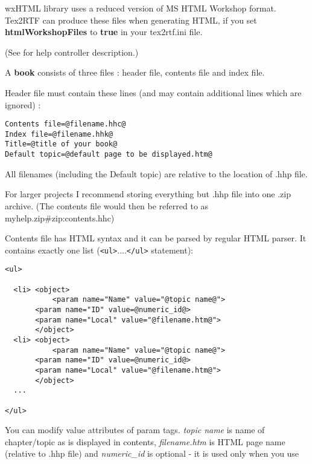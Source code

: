 \label{helpformat}

wxHTML library uses a reduced version of MS HTML Workshop format.
Tex2RTF can produce these files when generating HTML, if you set {\bf htmlWorkshopFiles} to {\bf true} in
your tex2rtf.ini file.

(See  for help controller description.)

A {\bf book} consists of three files : header file, contents file and index file.


Header file must contain these lines (and may contain additional lines which are ignored) :

\begin{verbatim}
Contents file=@filename.hhc@
Index file=@filename.hhk@
Title=@title of your book@
Default topic=@default page to be displayed.htm@
\end{verbatim}

All filenames (including the Default topic) are relative to the location of .hhp file.

For larger projects I recommend storing everything but .hhp file into one .zip archive. (The contents file 
would then be referred to as myhelp.zip\#zip:contents.hhc)


Contents file has HTML syntax and it can be parsed by regular HTML parser. It contains exactly one list
(\verb$<ul>$....\verb$</ul>$ statement):

\begin{verbatim}
<ul>

  <li> <object>
           <param name="Name" value="@topic name@">
	   <param name="ID" value=@numeric_id@>
	   <param name="Local" value="@filename.htm@">
       </object>
  <li> <object>
           <param name="Name" value="@topic name@">
	   <param name="ID" value=@numeric_id@>
	   <param name="Local" value="@filename.htm@">
       </object>
  ...    

</ul>
\end{verbatim}

You can modify value attributes of param tags. {\it topic name} is name of chapter/topic as is displayed in
contents, {\it filename.htm} is HTML page name (relative to .hhp file) and {\it numeric_id} is optional 
- it is used only when you use 

